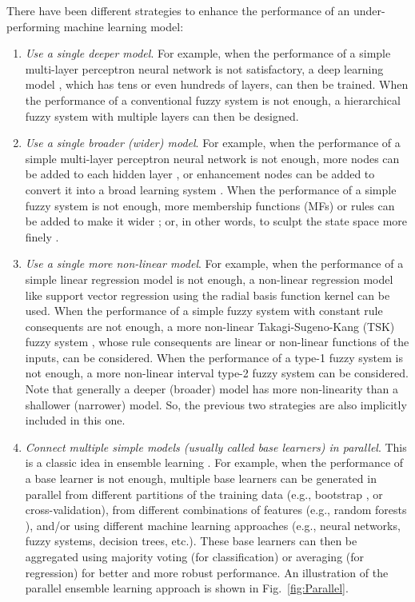 \documentclass[journal,twocolumn]{IEEEtran}
\begin{document}
There have been different strategies to enhance the performance of an under-performing machine learning model:
\begin{enumerate}
\item \emph{Use a single deeper model}. For example, when the performance of a simple multi-layer perceptron neural network \cite{Bishop1995} is not satisfactory, a deep learning model \cite{LeCun2015,He2016}, which has tens or even hundreds of layers, can then be trained. When the performance of a conventional fuzzy system is not enough, a hierarchical fuzzy system \cite{Raju1991} with multiple layers can then be designed.

\item \emph{Use a single broader (wider) model}. For example, when the performance of a simple multi-layer perceptron neural network is not enough, more nodes can be added to each hidden layer \cite{Bishop1995}, or enhancement nodes can be added to convert it into a broad learning system \cite{Chen2018b}. When the performance of a simple fuzzy system is not enough, more membership functions (MFs) or rules can be added to make it wider \cite{Mendel2017}; or, in other words, to sculpt the state space more finely \cite{Mendel2018}.

\item \emph{Use a single more non-linear model}. For example, when the performance of a simple linear regression model is not enough, a non-linear regression model like support vector regression using the radial basis function kernel \cite{Smola2004} can be used. When the performance of a simple fuzzy system with constant rule consequents are not enough, a more non-linear Takagi-Sugeno-Kang (TSK) fuzzy system \cite{Takagi1985}, whose rule consequents are linear or non-linear functions of the inputs, can be considered. When the performance of a type-1 fuzzy system is not enough, a more non-linear interval type-2 fuzzy system \cite{drwuEAAI2006,drwuISA2006} can be considered. Note that generally a deeper (broader) model has more non-linearity than a shallower (narrower) model. So, the previous two strategies are also implicitly included in this one.

\item \emph{Connect multiple simple models (usually called base learners) in parallel}. This is a classic idea in ensemble learning \cite{Zhou2012}. For example, when the performance of a base learner is not enough, multiple base learners can be generated in parallel from different partitions of the training data (e.g., bootstrap \cite{Efron1993}, or cross-validation), from different combinations of features (e.g., random forests \cite{Breiman2001}), and/or using different machine learning approaches (e.g., neural networks, fuzzy systems, decision trees, etc.). These base learners can then be aggregated using majority voting (for classification) or averaging (for regression) for better and more robust performance. An illustration of the parallel ensemble learning approach is shown in Fig.~\ref{fig:Parallel}.


\end{enumerate}
\end{document}
